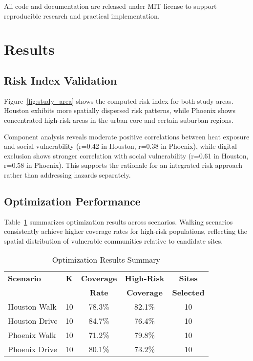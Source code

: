 \documentclass[conference]{IEEEtran}
\begin{document}
All code and documentation are released under MIT license to support reproducible research and practical implementation.

\section{Results}

\subsection{Risk Index Validation}

Figure~\ref{fig:study_area} shows the computed risk index for both study areas. Houston exhibits more spatially dispersed risk patterns, while Phoenix shows concentrated high-risk areas in the urban core and certain suburban regions.

Component analysis reveals moderate positive correlations between heat exposure and social vulnerability (r=0.42 in Houston, r=0.38 in Phoenix), while digital exclusion shows stronger correlation with social vulnerability (r=0.61 in Houston, r=0.58 in Phoenix). This supports the rationale for an integrated risk approach rather than addressing hazards separately.

\subsection{Optimization Performance}

Table~\ref{tab:results} summarizes optimization results across scenarios. Walking scenarios consistently achieve higher coverage rates for high-risk populations, reflecting the spatial distribution of vulnerable communities relative to candidate sites.

\begin{table}[htbp]
\caption{Optimization Results Summary}
\begin{center}
\begin{tabular}{|l|c|c|c|c|}
\hline
\textbf{Scenario} & \textbf{K} & \textbf{Coverage} & \textbf{High-Risk} & \textbf{Sites} \\
 & & \textbf{Rate} & \textbf{Coverage} & \textbf{Selected} \\
\hline
Houston Walk & 10 & 78.3\% & 82.1\% & 10 \\
Houston Drive & 10 & 84.7\% & 76.4\% & 10 \\
Phoenix Walk & 10 & 71.2\% & 79.8\% & 10 \\
Phoenix Drive & 10 & 80.1\% & 73.2\% & 10 \\
\hline
\end{tabular}
\label{tab:results}
\end{center}
\end{table}
\end{document}
